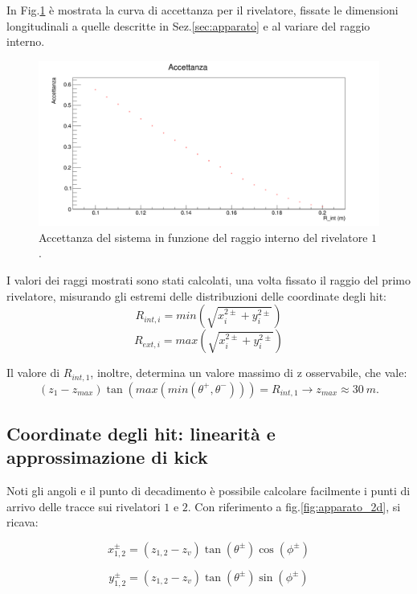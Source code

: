 \documentclass[8pt]{extarticle}
\begin{document}
In Fig.\ref{fig:acc_vs_rint} è mostrata la curva di accettanza per il rivelatore, fissate le dimensioni longitudinali a quelle descritte in Sez.\ref{sec:apparato} e al variare del raggio interno.

\begin{figure}
	\begin{center}
		\includegraphics[scale=0.3]{acc_vs_rint} 
		\caption{Accettanza del sistema in funzione del raggio interno del rivelatore $1$.}
		\label{fig:acc_vs_rint}
	\end{center}
\end{figure}

I valori dei raggi mostrati sono stati calcolati, una volta fissato il raggio del primo rivelatore, misurando gli estremi delle distribuzioni delle coordinate degli hit: 
$$
R_{int, i} = min(\sqrt{x_i^{2 \pm} + y_i^{2 \pm}})
$$
$$
R_{ext, i} = max(\sqrt{x_i^{2 \pm} + y_i^{2 \pm}})
$$

Il valore di $R_{int, 1}$, inoltre, determina un valore massimo di z osservabile, che vale: \\
$$
(z_1 - z_{max})\tan{(max(min(\theta^+, \theta^-)))} = R_{int,1} \rightarrow z_{max} \approx 30\ m.
$$

\subsection{Coordinate degli hit: linearità e approssimazione di kick}
Noti gli angoli e il punto di decadimento è possibile calcolare facilmente i punti di arrivo delle tracce sui rivelatori $1$ e $2$. Con riferimento a fig.\ref{fig:apparato_2d}, si ricava:

\begin{equation}
x_{1,2}^{\pm} = (z_{1,2} - z_v) \tan(\theta^{\pm})\cos(\phi^{\pm})
\end{equation}

\begin{equation}
y_{1,2}^{\pm} = (z_{1,2} - z_v) \tan(\theta^{\pm})\sin(\phi^{\pm})
\end{equation}
\end{document}
